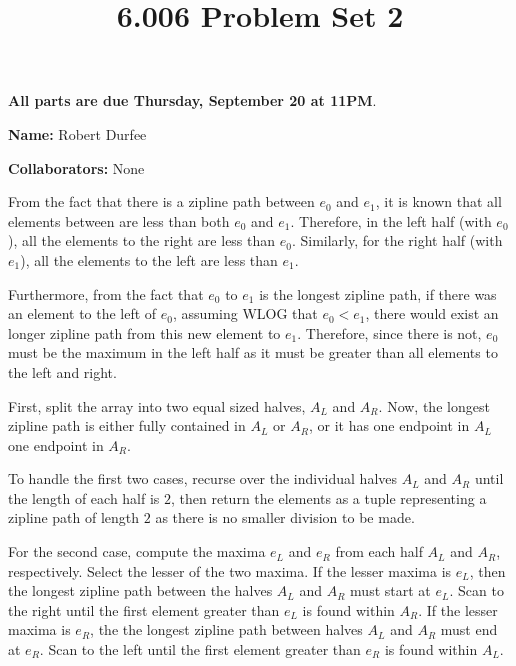 \documentclass[12pt,twoside]{article}
\title{6.006 Problem Set 2}
\newcommand{\theproblemsetnum}{2}
\newcommand{\releasedate}{Thursday, September 13}
\newcommand{\partaduedate}{Thursday, September 20}
\begin{document}
\handout{Problem Set \theproblemsetnum}{\releasedate}
\textbf{All parts are due {\bf \partaduedate} at {\bf 11PM}}.

\setlength{\parindent}{0pt}
\medskip\hrulefill\medskip

{\bf Name:} Robert Durfee

\medskip

{\bf Collaborators:} None

\medskip\hrulefill

\begin{problems}

\problem 

\begin{problemparts}

    \problempart From the fact that there is a zipline path between $ e_0 $
        and $ e_1 $, it is known that all elements between are less than both $
        e_0 $ and $ e_1 $. Therefore, in the left half (with $ e_0 $), all the
        elements to the right are less than $ e_0 $. Similarly, for the right
        half (with $ e_1 $), all the elements to the left are less than $ e_1 $.

        Furthermore, from the fact that $ e_0 $ to $ e_1 $ is the longest
        zipline path, if there was an element to the left of $ e_0 $,
        assuming WLOG that $ e_0 < e_1 $, there would exist an longer zipline
        path from this new element to $ e_1 $. Therefore, since there is not,
        $ e_0 $ must be the maximum in the left half as it must be greater
        than all elements to the left and right.

     First, split the array into two equal
        sized halves, $ A_L $ and $ A_R $. Now, the longest zipline path is
        either fully contained in $ A_L $ or $ A_R $, or it has one endpoint in $
        A_L $ one endpoint in $ A_R$.

        To handle the first two cases, recurse over the individual halves $
        A_L $ and $ A_R $ until the length of each half is $ 2 $, then return
        the elements as a tuple representing a zipline path of length $ 2 $
        as there is no smaller division to be made.
        
        For the second case, compute the maxima $ e_L $ and $ e_R $ from each
        half $ A_L $ and $ A_R $, respectively. Select the lesser of the two
        maxima. If the lesser maxima is $ e_L $, then the longest zipline
        path between the halves $ A_L $ and $ A_R $ must start at $ e_L $.
        Scan to the right until the first element greater than $ e_L $ is
        found within $ A_R $. If the lesser maxima is $ e_R $, the the
        longest zipline path between halves $ A_L $ and $ A_R $ must end at $
        e_R $. Scan to the left until the first element greater than $ e_R $
        is found within $ A_L$.


\end{problemparts}
\end{problems}
\end{document}
